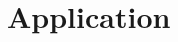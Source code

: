 \documentclass[a4paper, 12pt]{article}
\theoremstyle{plain}
\theoremstyle{definition}
\theoremstyle{remark}
\newcommand{\E}{\mathsf{E}}
\newcommand{\OO}{\mathbb{O}}
\newcommand{\uPi}{\overline{\Pi}}
\newcommand{\ee}{\text{\sc e}}
\begin{document}








\section{Application}
\label{S:ware}
\end{document}

